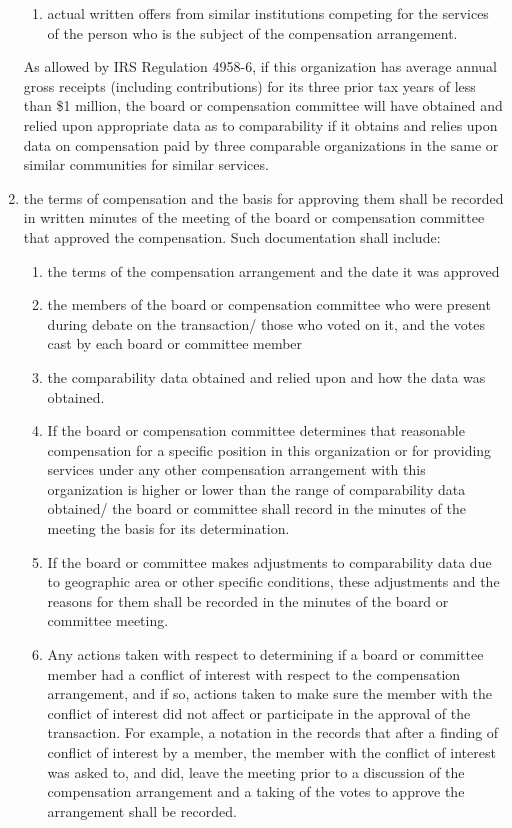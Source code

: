 \documentclass{article}
\begin{document}
\begin{enumerate}[\indent (a)]
\begin{enumerate}[\indent 1)]
			\item actual written offers from similar institutions competing for the services of the person who is the subject of the compensation arrangement.
		\end{enumerate}
		As allowed by IRS Regulation 4958-6, if this organization has average annual gross receipts (including contributions) for its three prior tax years of less than \$1 million, the board or compensation committee will have obtained and relied upon appropriate data as to comparability if it obtains and relies upon data on compensation paid by three comparable organizations in the same or similar communities for similar services.
		\item the terms of compensation and the basis for approving them shall be recorded in written minutes of the meeting of the board or compensation committee that approved the compensation. Such documentation shall include:
		\begin{enumerate}[\indent 1)] 
			\item the terms of the compensation arrangement and the date it was approved
			\item the members of the board or compensation committee who were present during debate on the transaction/ those who voted on it, and the votes cast by each board or committee member 
			\item the comparability data obtained and relied upon and how the data was obtained.
			\item If the board or compensation committee determines that reasonable compensation for a specific position in this organization or for providing services under any other compensation arrangement with this organization is higher or lower than the range of comparability data obtained/ the board or committee shall record in the minutes of the meeting the basis for its determination.
			\item If the board or committee makes adjustments to comparability data due to geographic area or other specific conditions, these adjustments and the reasons for them shall be recorded in the minutes of the board or committee meeting.
			\item Any actions taken with respect to determining if a board or committee member had a conflict of interest with respect to the compensation arrangement, and if so, actions taken to make sure the member with the conflict of interest did not affect or participate in the approval of the transaction. For example, a notation in the records that after a finding of conflict of interest by a member, the member with the conflict of interest was asked to, and did, leave the meeting prior to a discussion of the compensation arrangement and a taking of the votes to approve the arrangement shall be recorded.

\end{enumerate}
\end{enumerate}
\end{document}

